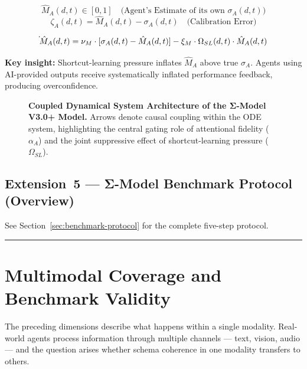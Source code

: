\documentclass[11pt,a4paper]{article}
\begin{document}
\begin{equation}\label{eq:self-model}
\hat{M}_A(d,t) \in [0,1] \quad \text{(Agent's Estimate of its own } \sigma_A(d,t))
\end{equation}
\begin{equation}\label{eq:calibration-error}
\zeta_A(d,t) = \hat{M}_A(d,t) - \sigma_A(d,t) \quad \text{(Calibration Error)}
\end{equation}

\begin{equation}\label{eq:self-model-ode}
\dot{\vphantom{M}}\hat{M}_A(d,t) = \nu_M \cdot [\sigma_A(d,t) - \hat{M}_A(d,t)] - \xi_M \cdot \Omega_{SL}(d,t) \cdot \hat{M}_A(d,t)
\end{equation}

\textbf{Key insight:} Shortcut-learning pressure inflates $\hat{M}_A$ above true
$\sigma_A$. Agents using AI-provided outputs receive systematically
inflated performance feedback, producing overconfidence.

\begin{figure}[htbp]
\centering
\resizebox{0.9\textwidth}{!}{}
\caption{\textbf{Coupled Dynamical System Architecture of the Σ-Model
V3.0+ Model.} Arrows denote causal coupling within the ODE system,
highlighting the central gating role of attentional fidelity ($\alpha_A$)
and the joint suppressive effect of shortcut-learning pressure ($\Omega_{SL}$).}
\label{fig:coupled-system}
\end{figure}

\subsection{Extension~5 --- Σ-Model Benchmark Protocol (Overview)}\label{sec:benchmark-overview}

See Section~\ref{sec:benchmark-protocol} for the complete five-step
protocol.

\noindent\rule{\linewidth}{0.4pt}

\section{Multimodal Coverage and Benchmark Validity}\label{sec:multimodal}

The preceding dimensions describe what happens within a single modality. Real-world agents process information through multiple channels --- text, vision, audio --- and the question arises whether schema coherence in one modality transfers to others.
\end{document}
